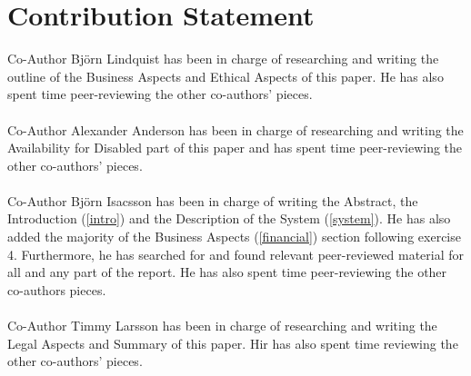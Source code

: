 \documentclass[conference]{IEEEtran}
\begin{document}
\section{Contribution Statement}
\label{contribution}

Co-Author Björn Lindquist has been in charge of researching and writing the outline of the Business Aspects and Ethical Aspects of this paper. He has also spent time peer-reviewing the other co-authors' pieces.
\\
\\
Co-Author Alexander Anderson has been in charge of researching and writing the Availability for Disabled part of this paper and has spent time peer-reviewing the other co-authors' pieces.
\\
\\
Co-Author Björn Isacsson has been in charge of writing the Abstract, the Introduction (\ref{intro}) and the Description of the System (\ref{system}). He has also added the majority of the Business Aspects (\ref{financial}) section following exercise 4. Furthermore, he has searched for and found relevant peer-reviewed material for all and any part of the report. He has also spent time peer-reviewing the other co-authors pieces. 
\\
\\
Co-Author Timmy Larsson has been in charge of researching and writing the Legal Aspects and Summary of this paper. Hir has also spent time reviewing the other co-authors' pieces.
\end{document}
